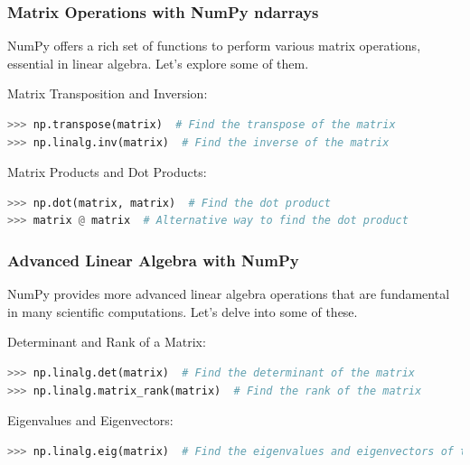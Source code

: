 \begin{frame}[fragile]
  \frametitle{Matrix Operations with NumPy ndarrays}
  NumPy offers a rich set of functions to perform various matrix operations, essential in linear algebra. Let's explore some of them.\pause

  Matrix Transposition and Inversion:
  \begin{lstlisting}[language=Python, numbers=none]
>>> np.transpose(matrix)  # Find the transpose of the matrix
>>> np.linalg.inv(matrix)  # Find the inverse of the matrix
  \end{lstlisting}\pause

  Matrix Products and Dot Products:
  \begin{lstlisting}[language=Python, numbers=none]
>>> np.dot(matrix, matrix)  # Find the dot product
>>> matrix @ matrix  # Alternative way to find the dot product
  \end{lstlisting}
\end{frame}

\begin{frame}[fragile]
  \frametitle{Advanced Linear Algebra with NumPy}
  NumPy provides more advanced linear algebra operations that are fundamental in many scientific computations. Let's delve into some of these.\pause
  
  Determinant and Rank of a Matrix:
  \begin{lstlisting}[language=Python, numbers=none]
>>> np.linalg.det(matrix)  # Find the determinant of the matrix
>>> np.linalg.matrix_rank(matrix)  # Find the rank of the matrix
  \end{lstlisting}\pause
  
  Eigenvalues and Eigenvectors:
  \begin{lstlisting}[language=Python, numbers=none]
>>> np.linalg.eig(matrix)  # Find the eigenvalues and eigenvectors of the matrix
  \end{lstlisting}
\end{frame}


